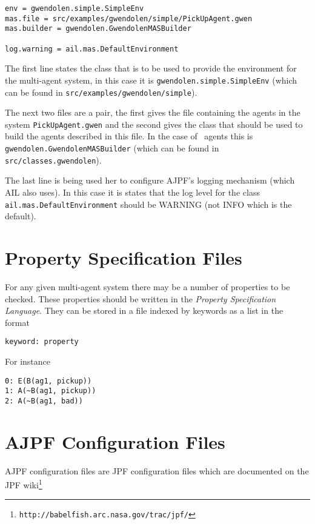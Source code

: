 \begin{lstlisting}
env = gwendolen.simple.SimpleEnv
mas.file = src/examples/gwendolen/simple/PickUpAgent.gwen
mas.builder = gwendolen.GwendolenMASBuilder

log.warning = ail.mas.DefaultEnvironment
\end{lstlisting}

The first line states the class that is to be used to provide the environment for the multi-agent system, in this case it is \texttt{gwendolen.simple.SimpleEnv} (which can be found in \texttt{src/examples/gwendolen/simple}).

The next two files are a pair, the first gives the file containing the agents in the system \texttt{PickUpAgent.gwen} and the second gives the class that should be used to build the agents described in this file.  In the case of \gwendolen\ agents this is \texttt{gwendolen.GwendolenMASBuilder} (which can be found in \texttt{src/classes.gwendolen}).

The last line is being used her to configure AJPF's logging mechanism (which AIL also uses).  In this case it is states that the log level for the class \texttt{ail.mas.DefaultEnvironment} should be WARNING (not INFO which is the default).

\section{Property Specification Files}

For any given multi-agent system there may be a number of properties to be checked.  These properties should be written in the \emph{Property Specification Language}.  They can be stored in a file indexed by keywords as a list in the format

\texttt{keyword: property}

For instance
\begin{lstlisting}
0: E(B(ag1, pickup))
1: A(~B(ag1, pickup))
2: A(~B(ag1, bad))
\end{lstlisting}

\section{AJPF Configuration Files}
AJPF configuration files are JPF configuration files which are documented on the JPF wiki\footnote{\texttt{http://babelfish.arc.nasa.gov/trac/jpf/}}

